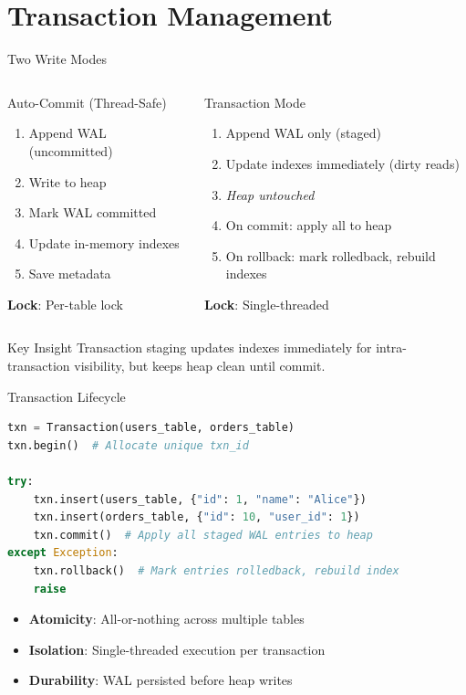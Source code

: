 \documentclass[aspectratio=169]{beamer}
\begin{document}
\section{Transaction Management}

\begin{frame}{Two Write Modes}
\begin{columns}
\begin{block}{Auto-Commit (Thread-Safe)}
\begin{enumerate}
  \item Append WAL (uncommitted)
  \item Write to heap
  \item Mark WAL committed
  \item Update in-memory indexes
  \item Save metadata
\end{enumerate}
\textbf{Lock}: Per-table lock
\end{block}

\begin{block}{Transaction Mode}
\begin{enumerate}
  \item Append WAL only (staged)
  \item Update indexes immediately (dirty reads)
  \item \textit{Heap untouched}
  \item On commit: apply all to heap
  \item On rollback: mark rolledback, rebuild indexes
\end{enumerate}
\textbf{Lock}: Single-threaded
\end{block}
\end{columns}

\vspace{0.5cm}
\begin{alertblock}{Key Insight}
Transaction staging updates indexes immediately for intra-transaction visibility, but keeps heap clean until commit.
\end{alertblock}
\end{frame}

\begin{frame}[fragile]{Transaction Lifecycle}
\begin{lstlisting}[language=Python]
txn = Transaction(users_table, orders_table)
txn.begin()  # Allocate unique txn_id

try:
    txn.insert(users_table, {"id": 1, "name": "Alice"})
    txn.insert(orders_table, {"id": 10, "user_id": 1})
    txn.commit()  # Apply all staged WAL entries to heap
except Exception:
    txn.rollback()  # Mark entries rolledback, rebuild index
    raise
\end{lstlisting}

\begin{itemize}
  \item \textbf{Atomicity}: All-or-nothing across multiple tables
  \item \textbf{Isolation}: Single-threaded execution per transaction
  \item \textbf{Durability}: WAL persisted before heap writes
\end{itemize}
\end{frame}
\end{document}
